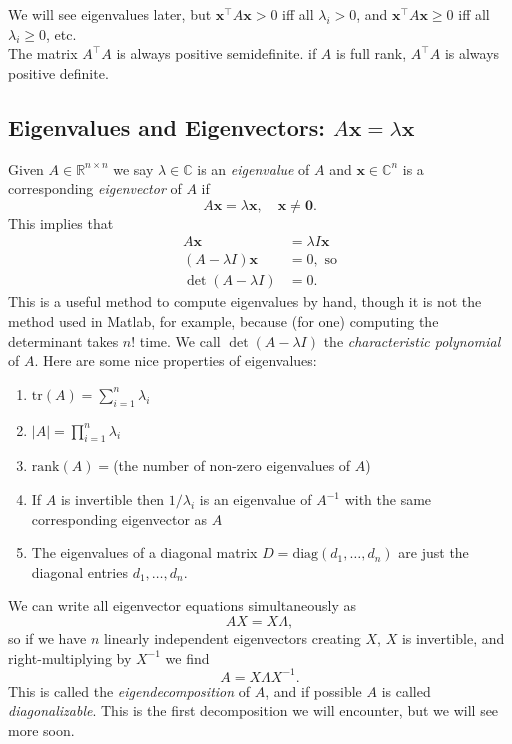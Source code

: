 \documentclass{article}
\newcommand{\1}{\mathbf{1}}
\newcommand{\0}{\mathbf{0}}
\newcommand{\xx}{\mathbf{x}}
\newcommand{\RR}{\mathbb{R}}
\newcommand{\CC}{\mathbb{C}}
\newcommand{\T}{\top}
\newcommand{\rank}{\mathrm{rank}}
\begin{document}
We will see eigenvalues later, but $\xx^\T A \xx > 0$ iff all $\lambda_i > 0$,
and $\xx^\T A\xx \geq 0$ iff all $\lambda_i \geq 0$, etc.\\

The matrix $A^\T A$ is always positive semidefinite. if $A$ is full rank, $A^\T A$
is always positive definite.

\subsection{Eigenvalues and Eigenvectors: $A\xx = \lambda \xx$}

Given $A\in\RR^{n\times n}$ we say $\lambda\in\CC$ is an \textit{eigenvalue} of
$A$ and $\xx\in\CC^n$ is a corresponding \textit{eigenvector} of $A$ if
\[
    A\xx = \lambda \xx,\quad \xx \neq \0.
\]
This implies that
\begin{align*}
    A\xx &= \lambda I \xx\\
    (A-\lambda I)\xx &= 0,\text{ so}\\
    \det(A-\lambda I) &= 0.
\end{align*}
This is a useful method to compute eigenvalues by hand, though it is not
the method used in Matlab, for example, because (for one) computing the
determinant takes $n!$ time. We call $\det(A-\lambda I)$ the \textit{characteristic
polynomial} of $A$. Here are some nice properties of eigenvalues:
\begin{enumerate}
    \item $\mathrm{tr}(A) = \sum_{i=1}^n \lambda_i$
    \item $|A| = \prod_{i=1}^n \lambda_i$
    \item $\rank (A) = $(the number of non-zero eigenvalues of $A$)
    \item If $A$ is invertible then $1/\lambda_i$ is an eigenvalue of
        $A^{-1}$ with the same corresponding eigenvector as $A$
    \item The eigenvalues of a diagonal matrix $D=\mathrm{diag}(d_1,\dots,d_n)$
        are just the diagonal entries $d_1,\dots,d_n$.
\end{enumerate}

We can write all eigenvector equations simultaneously as
\[
    AX = X\Lambda,
\]
so if we have $n$ linearly independent eigenvectors creating $X$,
$X$ is invertible, and right-multiplying by $X^{-1}$ we find
\[
    A = X\Lambda X^{-1}.
\]
This is called the \textit{eigendecomposition} of $A$, and if
possible $A$ is called \textit{diagonalizable}. This is the first
decomposition we will encounter, but we will see more soon.
\end{document}
